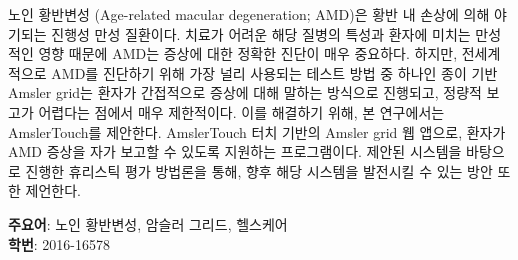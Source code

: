 \documentclass[doctor]{snuece-bs}
\begin{document}
\begin{summary}
	\par
	
	노인 황반변성 (Age-related macular degeneration; AMD)은 황반 내 손상에 의해 야기되는 진행성 만성 질환이다. 치료가 어려운 해당 질병의 특성과 환자에 미치는 만성적인 영향 때문에 AMD는 증상에 대한 정확한 진단이 매우 중요하다. 하지만, 전세계적으로 AMD를 진단하기 위해 가장 널리 사용되는 테스트 방법 중 하나인 종이 기반 Amsler grid는 환자가 간접적으로 증상에 대해 말하는 방식으로 진행되고, 정량적 보고가 어렵다는 점에서 매우 제한적이다. 이를 해결하기 위해, 본 연구에서는 AmslerTouch를 제안한다. AmslerTouch 터치 기반의 Amsler grid 웹 앱으로, 환자가 AMD 증상을 자가 보고할 수 있도록 지원하는 프로그램이다. 제안된 시스템을 바탕으로 진행한 휴리스틱 평가 방법론을 통해, 향후 해당 시스템을 발전시킬 수 있는 방안 또한 제언한다.
	\vfill
	\begin{minipage}[t][20mm][b]{\textwidth}
		{\bfseries 주요어}: 노인 황반변성, 암슬러 그리드, 헬스케어\\
		{\bfseries 학번}: 2016-16578\\
	\end{minipage}
\end{summary}
\end{document}
